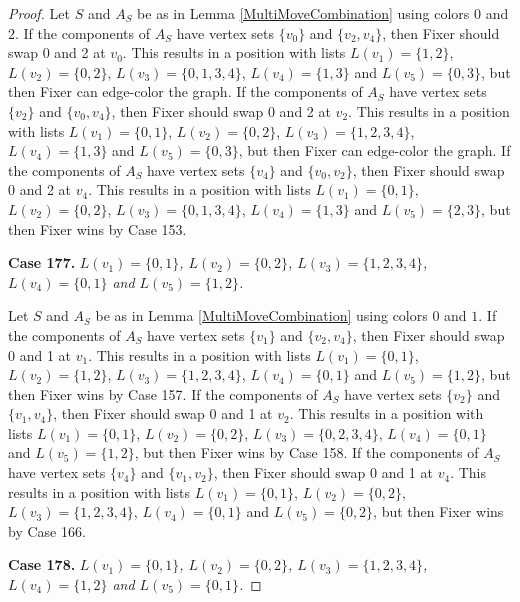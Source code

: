 \documentclass[12pt]{amsart}
\theoremstyle{plain}
\theoremstyle{definition}
\theoremstyle{remark}
\begin{document}
\begin{proof}
Let $S$ and $A_S$ be as in Lemma \ref{MultiMoveCombination} using colors $0$ and $2$. If the components of $A_S$ have vertex sets $\{v_0\}$ and $\{v_2, v_4\}$, then Fixer should swap 0 and 2 at $v_0$. This results in a position with lists $L(v_1) = \{1, 2\}$, $L(v_2) = \{0, 2\}$, $L(v_3) = \{0, 1, 3, 4\}$, $L(v_4) = \{1, 3\}$ and $L(v_5) = \{0, 3\}$, but then Fixer can edge-color the graph. If the components of $A_S$ have vertex sets $\{v_2\}$ and $\{v_0, v_4\}$, then Fixer should swap 0 and 2 at $v_2$. This results in a position with lists $L(v_1) = \{0, 1\}$, $L(v_2) = \{0, 2\}$, $L(v_3) = \{1, 2, 3, 4\}$, $L(v_4) = \{1, 3\}$ and $L(v_5) = \{0, 3\}$, but then Fixer can edge-color the graph. If the components of $A_S$ have vertex sets $\{v_4\}$ and $\{v_0, v_2\}$, then Fixer should swap 0 and 2 at $v_4$. This results in a position with lists $L(v_1) = \{0, 1\}$, $L(v_2) = \{0, 2\}$, $L(v_3) = \{0, 1, 3, 4\}$, $L(v_4) = \{1, 3\}$ and $L(v_5) = \{2, 3\}$, but then Fixer wins by Case 153. 

\noindent\textbf{Case 177.  }\textit{$L(v_1) = \{0, 1\}$, $L(v_2) = \{0, 2\}$, $L(v_3) = \{1, 2, 3, 4\}$, $L(v_4) = \{0, 1\}$ and $L(v_5) = \{1, 2\}$.}

Let $S$ and $A_S$ be as in Lemma \ref{MultiMoveCombination} using colors $0$ and $1$. If the components of $A_S$ have vertex sets $\{v_1\}$ and $\{v_2, v_4\}$, then Fixer should swap 0 and 1 at $v_1$. This results in a position with lists $L(v_1) = \{0, 1\}$, $L(v_2) = \{1, 2\}$, $L(v_3) = \{1, 2, 3, 4\}$, $L(v_4) = \{0, 1\}$ and $L(v_5) = \{1, 2\}$, but then Fixer wins by Case 157. If the components of $A_S$ have vertex sets $\{v_2\}$ and $\{v_1, v_4\}$, then Fixer should swap 0 and 1 at $v_2$. This results in a position with lists $L(v_1) = \{0, 1\}$, $L(v_2) = \{0, 2\}$, $L(v_3) = \{0, 2, 3, 4\}$, $L(v_4) = \{0, 1\}$ and $L(v_5) = \{1, 2\}$, but then Fixer wins by Case 158. If the components of $A_S$ have vertex sets $\{v_4\}$ and $\{v_1, v_2\}$, then Fixer should swap 0 and 1 at $v_4$. This results in a position with lists $L(v_1) = \{0, 1\}$, $L(v_2) = \{0, 2\}$, $L(v_3) = \{1, 2, 3, 4\}$, $L(v_4) = \{0, 1\}$ and $L(v_5) = \{0, 2\}$, but then Fixer wins by Case 166. 

\noindent\textbf{Case 178.  }\textit{$L(v_1) = \{0, 1\}$, $L(v_2) = \{0, 2\}$, $L(v_3) = \{1, 2, 3, 4\}$, $L(v_4) = \{1, 2\}$ and $L(v_5) = \{0, 1\}$.}


\end{proof}
\end{document}
